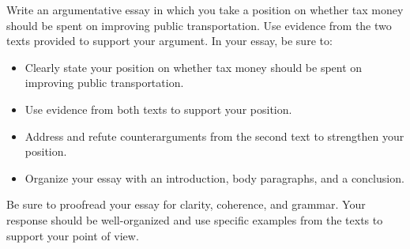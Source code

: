 \documentclass[12pt]{article}
\begin{document}
Write an argumentative essay in which you take a position on whether tax money should be spent on improving public transportation. Use evidence from the two texts provided to support your argument. In your essay, be sure to:

\begin{itemize}
    \item Clearly state your position on whether tax money should be spent on improving public transportation.
    \item Use evidence from both texts to support your position.
    \item Address and refute counterarguments from the second text to strengthen your position.
    \item Organize your essay with an introduction, body paragraphs, and a conclusion.
\end{itemize}

Be sure to proofread your essay for clarity, coherence, and grammar. Your response should be well-organized and use specific examples from the texts to support your point of view.
\end{document}
